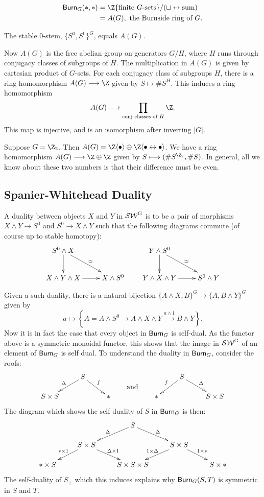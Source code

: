 \documentclass[11pt]{article}
\begin{document}
\begin{FirstNineLectures}
\begin{exmp*}
\begin{align*}
\Burnside_G(*,*)&=\Z\{\text{finite $G$-sets}\}/({\displaystyle\sqcup\leftrightarrow\text{sum}})\\
&=A(G),\text{ the Burnside ring of $G$.}
\end{align*}
\end{exmp*}
\begin{cor*}
The stable $0$-stem, $\{S^0,S^0\}^G$, equals $A(G)$.
\end{cor*}
Now $A(G)$ is the free abelian group on generators $G/H$, where $H$ runs through conjugacy classes of subgroups of $H$. The multiplication in $A(G)$ is given by cartesian product of $G$-sets. For each conjugacy class of subgroups $H$, there is a ring homomorphism $A(G)\to\Z$ given by $S\mapsto \# S^H$. This induces a ring homomorphism
\[A(G)\to\prod_\text{conj classes of $H$}\Z.\]
This map is injective, and is an isomorphism after inverting $|G|$.
\begin{exmp*}
Suppose $G=\Z_2$. Then $A(G)=\Z\langle\bullet\rangle\oplus \Z\langle\bullet\leftrightarrow\bullet\rangle$. We have a ring homomorphism $A(G)\to\Z\oplus\Z$ given by $S\mapsto(\#S^{\Z_2},\#S)$. In general, all we know about these two numbers is that their difference must be even.
\end{exmp*}
\subsection*{Spanier-Whitehead Duality}
\begin{defn*}
A duality between objects $X$ and $Y$ in $\operatorname{{\mathcal{SW}^G}}$ is to be a pair of morphisms $X\wedge Y\to S^0$ and $S^0\to X\wedge Y$ such that the following diagrams commute (of course up to stable homotopy):
\[\xymatrix{
S^0\wedge X\ar[d]\ar[dr]^\simeq\\
X\wedge Y\wedge X\ar[r]&X\wedge S^0
}
\qquad\xymatrix{
Y\wedge S^0\ar[d]\ar[dr]^\simeq\\
Y\wedge X\wedge Y\ar[r]&S^0\wedge Y
}\]
\end{defn*}
Given a such duality, there is a natural bijection
$\{A\wedge X,B\}^G\to\{A,B\wedge Y\}^G$ given by
\[a\mapsto\left\{A=A\wedge S^0\to A\wedge X\wedge Y\overset{a\wedge1}{\to}B\wedge Y\right\}.\]
Now it is in fact the case that every object in $\operatorname{{\mathsf{Burn}}}_G$ is self-dual. As the functor above is a symmetric monoidal functor, this shows that the image in $\operatorname{{\mathcal{SW}^G}}$ of an element of $\operatorname{{\mathsf{Burn}}}_G$ is self dual. To understand the duality in $\operatorname{{\mathsf{Burn}}}_G$, consider the roofs:
\[\xymatrix@R=5mm{&S\ar[dl]_\Delta\ar[dr]^f\\S\times S&&\ast}
\qquad\raisebox{-.5cm}{\text{and}}\qquad
\xymatrix@R=5mm{&S\ar[dl]_f\ar[dr]^\Delta\\\ast&&S\times S}\]
The diagram which shows the self duality of $S$ in $\operatorname{{\mathsf{Burn}}}_G$ is then:
\[\xymatrix@R=5mm{
&&S\ar[ld]_\Delta\ar[rd]^\Delta\\
&S\times S\ar[ld]_{\ast\times1}\ar[rd]^{\Delta\times1}&&S\times S\ar[ld]_{1\times\Delta}\ar[rd]^{1\times\ast}\\
\ast\times S&&S\times S\times S&&S\times\ast
}\]
The self-duality of $S_+$ which this induces explains why $\operatorname{{\mathsf{Burn}}}_G(S,T)$ is symmetric in $S$ and $T$.


\end{FirstNineLectures}
\end{document}
